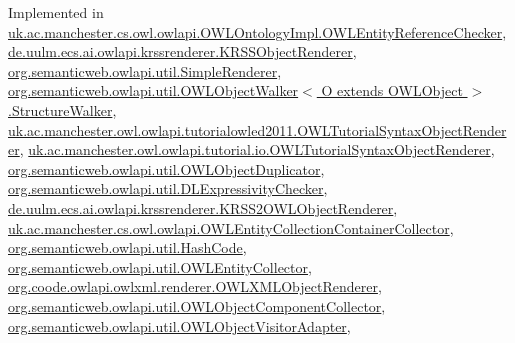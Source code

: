 Implemented in \hyperlink{classuk_1_1ac_1_1manchester_1_1cs_1_1owl_1_1owlapi_1_1_o_w_l_ontology_impl_1_1_o_w_l_entity_reference_checker_a3596675c180104dee55bfef9fd434885}{uk.\-ac.\-manchester.\-cs.\-owl.\-owlapi.\-O\-W\-L\-Ontology\-Impl.\-O\-W\-L\-Entity\-Reference\-Checker}, \hyperlink{classde_1_1uulm_1_1ecs_1_1ai_1_1owlapi_1_1krssrenderer_1_1_k_r_s_s_object_renderer_a35fa2da295cde471b73c1d5285d11a73}{de.\-uulm.\-ecs.\-ai.\-owlapi.\-krssrenderer.\-K\-R\-S\-S\-Object\-Renderer}, \hyperlink{classorg_1_1semanticweb_1_1owlapi_1_1util_1_1_simple_renderer_a8c7cf835a3bac363396b0efca5be8ea2}{org.\-semanticweb.\-owlapi.\-util.\-Simple\-Renderer}, \hyperlink{classorg_1_1semanticweb_1_1owlapi_1_1util_1_1_o_w_l_object_walker_3_01_o_01extends_01_o_w_l_object_01_4_1_1_structure_walker_a7ae8b18bb362ffa7e3d1d47b26446e6d}{org.\-semanticweb.\-owlapi.\-util.\-O\-W\-L\-Object\-Walker$<$ O extends O\-W\-L\-Object $>$.\-Structure\-Walker}, \hyperlink{classuk_1_1ac_1_1manchester_1_1owl_1_1owlapi_1_1tutorialowled2011_1_1_o_w_l_tutorial_syntax_object_renderer_a2dea8721b0941401c6c5118bbd86f046}{uk.\-ac.\-manchester.\-owl.\-owlapi.\-tutorialowled2011.\-O\-W\-L\-Tutorial\-Syntax\-Object\-Renderer}, \hyperlink{classuk_1_1ac_1_1manchester_1_1owl_1_1owlapi_1_1tutorial_1_1io_1_1_o_w_l_tutorial_syntax_object_renderer_aaffe586c489a42a609ba2d7ecc373bd3}{uk.\-ac.\-manchester.\-owl.\-owlapi.\-tutorial.\-io.\-O\-W\-L\-Tutorial\-Syntax\-Object\-Renderer}, \hyperlink{classorg_1_1semanticweb_1_1owlapi_1_1util_1_1_o_w_l_object_duplicator_ab73243169cce33939c130d4321905596}{org.\-semanticweb.\-owlapi.\-util.\-O\-W\-L\-Object\-Duplicator}, \hyperlink{classorg_1_1semanticweb_1_1owlapi_1_1util_1_1_d_l_expressivity_checker_a3265e0e87aca722d4c4fda3382c68cb9}{org.\-semanticweb.\-owlapi.\-util.\-D\-L\-Expressivity\-Checker}, \hyperlink{classde_1_1uulm_1_1ecs_1_1ai_1_1owlapi_1_1krssrenderer_1_1_k_r_s_s2_o_w_l_object_renderer_aa617014f3a3ba39e3defa90806581afd}{de.\-uulm.\-ecs.\-ai.\-owlapi.\-krssrenderer.\-K\-R\-S\-S2\-O\-W\-L\-Object\-Renderer}, \hyperlink{classuk_1_1ac_1_1manchester_1_1cs_1_1owl_1_1owlapi_1_1_o_w_l_entity_collection_container_collector_ad0e1e96065939a40bd1fa5735ace202c}{uk.\-ac.\-manchester.\-cs.\-owl.\-owlapi.\-O\-W\-L\-Entity\-Collection\-Container\-Collector}, \hyperlink{classorg_1_1semanticweb_1_1owlapi_1_1util_1_1_hash_code_a7c503b4df85ae8956e0c5c932cfcb397}{org.\-semanticweb.\-owlapi.\-util.\-Hash\-Code}, \hyperlink{classorg_1_1semanticweb_1_1owlapi_1_1util_1_1_o_w_l_entity_collector_a288d545907abbaafec07d88e3b1e2ed4}{org.\-semanticweb.\-owlapi.\-util.\-O\-W\-L\-Entity\-Collector}, \hyperlink{classorg_1_1coode_1_1owlapi_1_1owlxml_1_1renderer_1_1_o_w_l_x_m_l_object_renderer_a4afe38cae17c8bc24e757d30e67b845d}{org.\-coode.\-owlapi.\-owlxml.\-renderer.\-O\-W\-L\-X\-M\-L\-Object\-Renderer}, \hyperlink{classorg_1_1semanticweb_1_1owlapi_1_1util_1_1_o_w_l_object_component_collector_abd925913d81783a21203142e211b82de}{org.\-semanticweb.\-owlapi.\-util.\-O\-W\-L\-Object\-Component\-Collector}, \hyperlink{classorg_1_1semanticweb_1_1owlapi_1_1util_1_1_o_w_l_object_visitor_adapter_a0fc74d675ce54f4968dfe2c52f04b0fe}{org.\-semanticweb.\-owlapi.\-util.\-O\-W\-L\-Object\-Visitor\-Adapter}, 